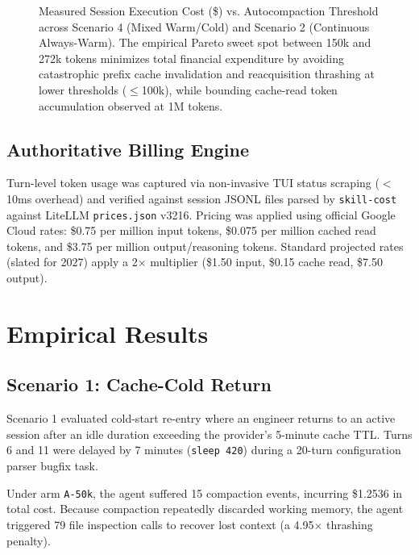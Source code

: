 \documentclass[10pt,twocolumn,a4paper]{article}
\begin{document}
\begin{figure}[t]
\caption{Measured Session Execution Cost (\$) vs. Autocompaction Threshold across Scenario 4 (Mixed Warm/Cold) and Scenario 2 (Continuous Always-Warm). The empirical Pareto sweet spot between 150k and 272k tokens minimizes total financial expenditure by avoiding catastrophic prefix cache invalidation and reacquisition thrashing at lower thresholds ($\le$100k), while bounding cache-read token accumulation observed at 1M tokens.}
\label{fig:compaction_curve}
\end{figure}

\subsection{Authoritative Billing Engine}
Turn-level token usage was captured via non-invasive TUI status scraping ($<$10ms overhead) and verified against session JSONL files parsed by \texttt{skill-cost} against LiteLLM \texttt{prices.json} v3216. Pricing was applied using official Google Cloud rates: \$0.75 per million input tokens, \$0.075 per million cached read tokens, and \$3.75 per million output/reasoning tokens. Standard projected rates (slated for 2027) apply a 2$\times$ multiplier (\$1.50 input, \$0.15 cache read, \$7.50 output).

\section{Empirical Results}

\subsection{Scenario 1: Cache-Cold Return}
Scenario 1 evaluated cold-start re-entry where an engineer returns to an active session after an idle duration exceeding the provider's 5-minute cache TTL. Turns 6 and 11 were delayed by 7 minutes (\texttt{sleep 420}) during a 20-turn configuration parser bugfix task.

Under arm \texttt{A-50k}, the agent suffered 15 compaction events, incurring \$1.2536 in total cost. Because compaction repeatedly discarded working memory, the agent triggered 79 file inspection calls to recover lost context (a 4.95$\times$ thrashing penalty).
\end{document}
